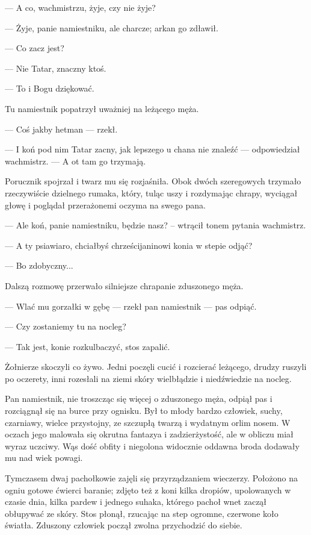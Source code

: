— A co, wachmistrzu, żyje, czy nie żyje?

— Żyje, panie namiestniku, ale charcze; arkan go zdławił.

— Co zacz jest?

— Nie Tatar, znaczny ktoś.

— To i Bogu dziękować.

Tu namiestnik popatrzył uważniej na leżącego męża.

— Coś jakby hetman — rzekł.

— I koń pod nim Tatar zacny, jak lepszego u chana nie znaleźć — odpowiedział wachmistrz. — A ot tam go trzymają.

Porucznik spojrzał i twarz mu się rozjaśniła. Obok dwóch szeregowych trzymało rzeczywiście dzielnego rumaka, który, tuląc uszy i rozdymając chrapy, wyciągał głowę i poglądał przerażonemi oczyma na swego pana.

— Ale koń, panie namiestniku, będzie nasz? – wtrącił tonem pytania wachmistrz.

— A ty psiawiaro, chciałbyś chrześcijaninowi konia w stepie odjąć?

— Bo zdobyczny...

Dalszą rozmowę przerwało silniejsze chrapanie zduszonego męża.

— Wlać mu gorzałki w gębę — rzekł pan namiestnik — pas odpiąć.

— Czy zostaniemy tu na nocleg?

— Tak jest, konie rozkulbaczyć, stos zapalić.

Żołnierze skoczyli co żywo. Jedni poczęli cucić i rozcierać leżącego, drudzy ruszyli po oczerety, inni rozesłali na ziemi skóry wielbłądzie i niedźwiedzie na nocleg.

Pan namiestnik, nie troszcząc się więcej o zduszonego męża, odpiął pas i rozciągnął się na burce przy ognisku. Był to młody bardzo człowiek, suchy, czarniawy, wielce przystojny, ze szczupłą twarzą i wydatnym orlim nosem. W oczach jego malowała się okrutna fantazya i zadzierżystość, ale w obliczu miał wyraz uczciwy. Wąs dość obfity i niegolona widocznie oddawna broda dodawały mu nad wiek powagi.

Tymczasem dwaj pachołkowie zajęli się przyrządzaniem wieczerzy. Położono na ogniu gotowe ćwierci baranie; zdjęto też z koni kilka dropiów, upolowanych w czasie dnia, kilka pardew i jednego suhaka, którego pachoł wnet zaczął obłupywać ze skóry. Stos płonął, rzucając na step ogromne, czerwone koło światła. Zduszony człowiek począł zwolna przychodzić do siebie.

